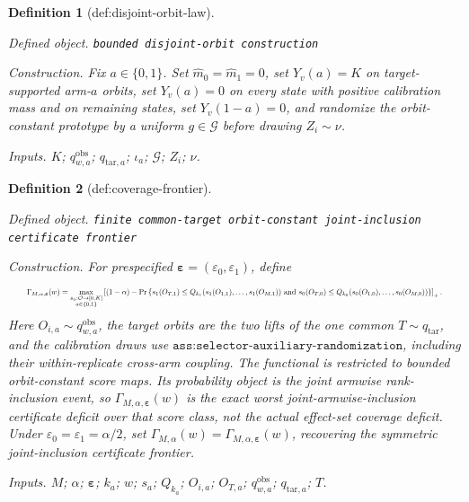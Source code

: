 \documentclass{article}
\newtheorem{definition}{Definition}
\begin{document}
\begin{definition}[def:disjoint-orbit-law]\label{def:disjoint-orbit-law}
\par\smallskip\noindent\emph{Defined object.} \texttt{bounded disjoint-\allowbreak{}orbit construction}
\par\smallskip\noindent\emph{Construction.} Fix \(a\in\{0,1\}\). Set \(\widehat m_0=\widehat m_1=0\), set \(Y_v(a)=K\) on target-supported arm-\(a\) orbits, set \(Y_v(a)=0\) on every state with positive calibration mass and on remaining states, set \(Y_v(1-a)=0\), and randomize the orbit-constant prototype by a uniform \(g\in\mathcal G\) before drawing \(Z_i\sim\nu\).
\par\smallskip\noindent\emph{Inputs.} \(K\); \(q^{\mathrm{obs}}_{w,a}\); \(q_{\mathrm{tar},a}\); \(\iota_a\); \(\mathcal G\); \(Z_i\); \(\nu\).
\end{definition}

\begin{definition}[def:coverage-frontier]\label{def:coverage-frontier}
\par\smallskip\noindent\emph{Defined object.} \texttt{finite common-\allowbreak{}target orbit-\allowbreak{}constant joint-\allowbreak{}inclusion certificate frontier}
\par\smallskip\noindent\emph{Construction.} For prespecified \(\boldsymbol\varepsilon=(\varepsilon_0,\varepsilon_1)\), define
\[
\makebox[\linewidth][c]{\resizebox{0.98\linewidth}{!}{\par\noindent \makebox[\linewidth][c]{\resizebox{0.98\linewidth}{!}{\(\displaystyle \displaystyle \Gamma_{M,\alpha,\boldsymbol\varepsilon}(w)=\max_{\substack{s_a:\mathcal O\to[0,K]\\a\in\{0,1\}}}\left[(1-\alpha)-\Pr\left\{s_1(O_{T,1})\le Q_{k_1}(s_1(O_{1,1}),\ldots,s_1(O_{M,1}))\ \text{and}\ s_0(O_{T,0})\le Q_{k_0}(s_0(O_{1,0}),\ldots,s_0(O_{M,0}))\right\}\right]_+.\)}}\par\noindent}}
\]
Here \(O_{i,a}\sim q^{\mathrm{obs}}_{w,a}\), the target orbits are the two lifts of the one common \(T\sim q_{\mathrm{tar}}\), and the calibration draws use \(\texttt{ass:selector-auxiliary-randomization}\), including their within-replicate cross-arm coupling. The functional is restricted to bounded orbit-constant score maps. Its probability object is the joint armwise rank-inclusion event, so \(\Gamma_{M,\alpha,\boldsymbol\varepsilon}(w)\) is the exact worst joint-armwise-inclusion certificate deficit over that score class, not the actual effect-set coverage deficit. Under \(\varepsilon_0=\varepsilon_1=\alpha/2\), set \(\Gamma_{M,\alpha}(w)=\Gamma_{M,\alpha,\boldsymbol\varepsilon}(w)\), recovering the symmetric joint-inclusion certificate frontier.
\par\smallskip\noindent\emph{Inputs.} \(M\); \(\alpha\); \(\boldsymbol\varepsilon\); \(k_a\); \(w\); \(s_a\); \(Q_{k_a}\); \(O_{i,a}\); \(O_{T,a}\); \(q^{\mathrm{obs}}_{w,a}\); \(q_{\mathrm{tar},a}\); \(T\).
\end{definition}
\end{document}
